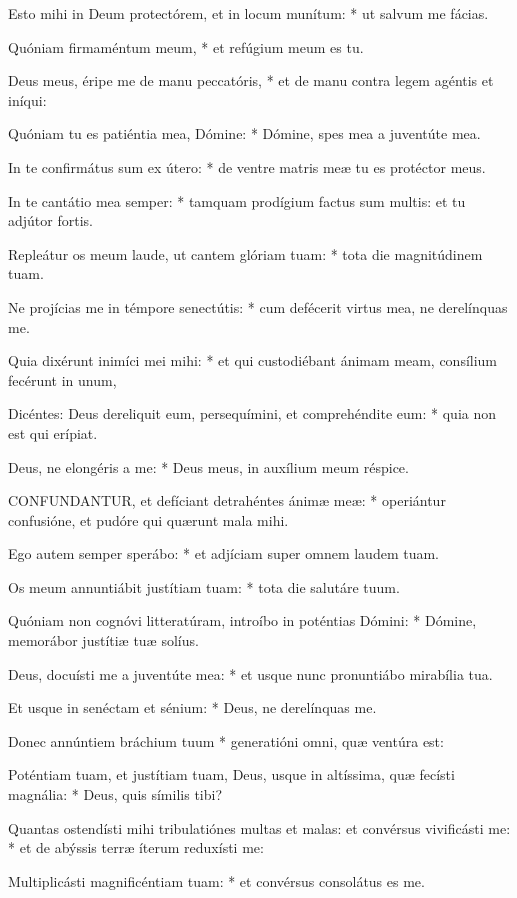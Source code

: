 Esto mihi in Deum protectórem, et in locum munítum: * ut salvum me fácias.

Quóniam firmaméntum meum, * et refúgium meum es tu.

Deus meus, éripe me de manu peccatóris, * et de manu contra legem agéntis et iníqui:

Quóniam tu es patiéntia mea, Dómine: * Dómine, spes mea a juventúte mea.

In te confirmátus sum ex útero: * de ventre matris meæ tu es protéctor meus.

In te cantátio mea semper: * tamquam prodígium factus sum multis: et tu adjútor fortis.

Repleátur os meum laude, ut cantem glóriam tuam: * tota die magnitúdinem tuam.

Ne projícias me in témpore senectútis: * cum defécerit virtus mea, ne derelínquas me.

Quia dixérunt inimíci mei mihi: * et qui custodiébant ánimam meam, consílium fecérunt in unum,

Dicéntes: Deus dereliquit eum, persequímini, et comprehéndite eum: * quia non est qui erípiat.

Deus, ne elongéris a me: * Deus meus, in auxílium meum réspice.


\lettrine[lines=2]{C}{ONFUNDANTUR}, et defíciant detrahéntes ánimæ meæ: * operiántur confusióne, et pudóre qui quærunt mala mihi.

Ego autem semper sperábo: * et adjíciam super omnem laudem tuam.

Os meum annuntiábit justítiam tuam: * tota die salutáre tuum.

Quóniam non cognóvi litteratúram, introíbo in poténtias Dómini: * Dómine, memorábor justítiæ tuæ solíus.

Deus, docuísti me a juventúte mea: * et usque nunc pronuntiábo mirabília tua.

Et usque in senéctam et sénium: * Deus, ne derelínquas me.

Donec annúntiem bráchium tuum * generatióni omni, quæ ventúra est:

Poténtiam tuam, et justítiam tuam, Deus, usque in altíssima, quæ fecísti magnália: * Deus, quis símilis tibi?

Quantas ostendísti mihi tribulatiónes multas et malas: et convérsus vivificásti me: * et de abýssis terræ íterum reduxísti me:

Multiplicásti magnificéntiam tuam: * et convérsus consolátus es me.

